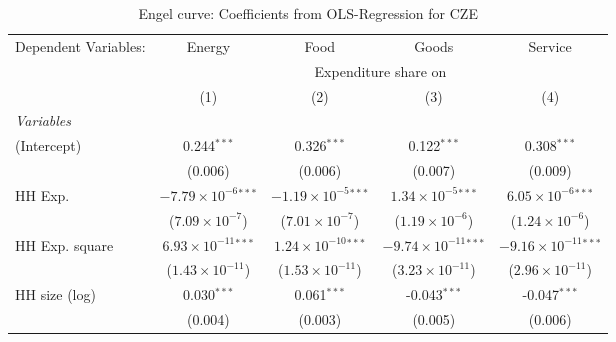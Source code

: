 
\begin{table}[htbp!]
   \centering
   \small
   \begin{adjustbox}{width = 1\textwidth, max height = 0.95\textheight, center}
      \begin{threeparttable}[b]
         \caption{\label{tab:Engel_parametric_CZE} Engel curve: Coefficients from OLS-Regression for CZE}
         \begin{tabular}{lcccc}
            \tabularnewline \midrule \midrule
            Dependent Variables: & Energy                         & Food                           & Goods                           & Service\\  
             & \multicolumn{4}{c}{Expenditure share on} \\ 
                                 & (1)                            & (2)                            & (3)                             & (4)\\  
            \midrule
            \emph{Variables}\\
            (Intercept)          & 0.244$^{***}$                  & 0.326$^{***}$                  & 0.122$^{***}$                   & 0.308$^{***}$\\   
                                 & (0.006)                        & (0.006)                        & (0.007)                         & (0.009)\\   
            HH Exp.              & $-7.79\times 10^{-6}$$^{***}$  & $-1.19\times 10^{-5}$$^{***}$  & $1.34\times 10^{-5}$$^{***}$    & $6.05\times 10^{-6}$$^{***}$\\    
                                 & ($7.09\times 10^{-7}$)         & ($7.01\times 10^{-7}$)         & ($1.19\times 10^{-6}$)          & ($1.24\times 10^{-6}$)\\    
            HH Exp. square       & $6.93\times 10^{-11}$$^{***}$  & $1.24\times 10^{-10}$$^{***}$  & $-9.74\times 10^{-11}$$^{***}$  & $-9.16\times 10^{-11}$$^{***}$\\    
                                 & ($1.43\times 10^{-11}$)        & ($1.53\times 10^{-11}$)        & ($3.23\times 10^{-11}$)         & ($2.96\times 10^{-11}$)\\    
            HH size (log)        & 0.030$^{***}$                  & 0.061$^{***}$                  & -0.043$^{***}$                  & -0.047$^{***}$\\   
                                 & (0.004)                        & (0.003)                        & (0.005)                         & (0.006)\\   

\end{tabular}
\end{threeparttable}
\end{adjustbox}
\end{table}
